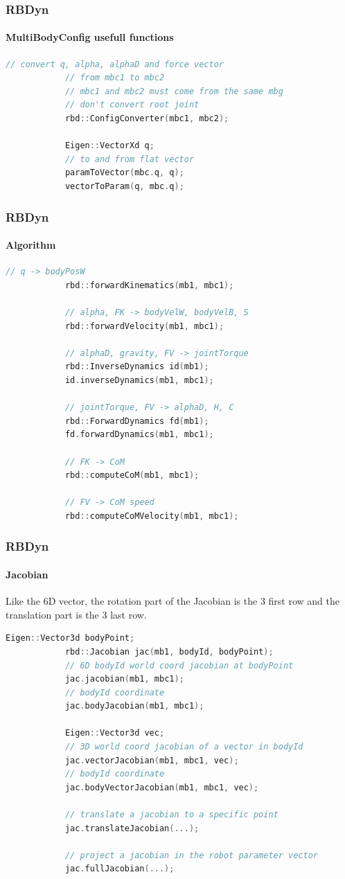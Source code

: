 \documentclass{beamer}
\begin{document}
	\begin{frame}[fragile]
		\frametitle{RBDyn}
		\framesubtitle{MultiBodyConfig usefull functions}
		\begin{lstlisting}[language=C++]
			// convert q, alpha, alphaD and force vector
			// from mbc1 to mbc2
			// mbc1 and mbc2 must come from the same mbg
			// don't convert root joint
			rbd::ConfigConverter(mbc1, mbc2);

			Eigen::VectorXd q;
			// to and from flat vector
			paramToVector(mbc.q, q);
			vectorToParam(q, mbc.q);
		\end{lstlisting}
	\end{frame}

	\begin{frame}[fragile]
		\frametitle{RBDyn}
		\framesubtitle{Algorithm}
		\begin{lstlisting}[language=C++]
			// q -> bodyPosW
			rbd::forwardKinematics(mb1, mbc1);

			// alpha, FK -> bodyVelW, bodyVelB, S
			rbd::forwardVelocity(mb1, mbc1);

			// alphaD, gravity, FV -> jointTorque
			rbd::InverseDynamics id(mb1);
			id.inverseDynamics(mb1, mbc1);

			// jointTorque, FV -> alphaD, H, C
			rbd::ForwardDynamics fd(mb1);
			fd.forwardDynamics(mb1, mbc1);

			// FK -> CoM
			rbd::computeCoM(mb1, mbc1);

			// FV -> CoM speed
			rbd::computeCoMVelocity(mb1, mbc1);
		\end{lstlisting}
	\end{frame}

	\begin{frame}[fragile]
		\frametitle{RBDyn}
		\framesubtitle{Jacobian}
		Like the 6D vector, the rotation part of the Jacobian is the 3 first row and the translation part is the 3 last row.
		\begin{lstlisting}[language=C++]
			Eigen::Vector3d bodyPoint;
			rbd::Jacobian jac(mb1, bodyId, bodyPoint);
			// 6D bodyId world coord jacobian at bodyPoint
			jac.jacobian(mb1, mbc1);
			// bodyId coordinate
			jac.bodyJacobian(mb1, mbc1);

			Eigen::Vector3d vec;
			// 3D world coord jacobian of a vector in bodyId
			jac.vectorJacobian(mb1, mbc1, vec);
			// bodyId coordinate
			jac.bodyVectorJacobian(mb1, mbc1, vec);

			// translate a jacobian to a specific point
			jac.translateJacobian(...);

			// project a jacobian in the robot parameter vector
			jac.fullJacobian(...);
		\end{lstlisting}
	\end{frame}
\end{document}
